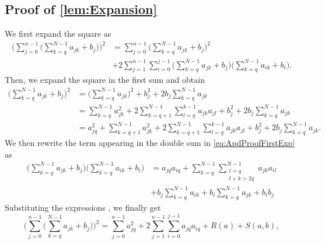 \documentclass[10pt]{article}
\begin{document}
\subsection*{Proof of \cref{lem:Expansion}} 
We first expand the square as
	\begin{equation}\label{eq:ApdProofFirstExp}
	\begin{aligned}
		\Big(\sum_{j=0}^{n-1} \Big(\sum_{k=q}^{N-1} a_{jk} + b_j\Big)\Big)^2 &= \sum_{j=0}^{n-1} \Big(\sum_{k=q}^{N-1} a_{jk} + b_j\Big)^2 \\
		&+ 2 \sum_{j=1}^{n-1} \sum_{i=0}^{j-1}\Big(\sum_{k=q}^{N-1} a_{jk} + b_j\Big)\Big(\sum_{k=q}^{N-1} a_{ik} + b_i\Big).
	\end{aligned}
	\end{equation}
	Then, we expand the square in the first sum and obtain
	\begin{equation}\label{eq:ApdProofSndExp}
	\begin{aligned}
		\Big(\sum_{k=q}^{N-1} a_{jk} + b_j\Big)^2 &= \Big(\sum_{k=q}^{N-1} a_{jk}\Big)^2 + b_j^2 + 2 b_j \sum_{k=q}^{N-1} a_{jk}\\
		&= \sum_{k=q}^{N-1} a_{jk}^2 + 2\sum_{k=q+1}^{N-1}\sum_{l=q}^{k-1} a_{jk} a_{jl} + b_j^2 + 2 b_j \sum_{k=q}^{N-1} a_{jk}\\
		&= a_{jq}^2 + \sum_{k=q+1}^{N-1} a_{jk}^2 + 2\sum_{k=q+1}^{N-1}\sum_{l=q}^{k-1} a_{jk} a_{jl} + b_j^2 + 2 b_j \sum_{k=q}^{N-1} a_{jk}.
	\end{aligned}
	\end{equation}	
	We then rewrite the term appearing in the double sum in \eqref{eq:ApdProofFirstExp} as
	\begin{equation}\label{eq:ApdProofThirdExp}
	\begin{aligned}
		\Big(\sum_{k=q}^{N-1} a_{jk} + b_j\Big)\Big(\sum_{k=q}^{N-1} a_{ik} + b_i\Big) &= a_{jq}a_{iq} + \sum_{k=q}^{N-1}\sum_{\substack{l=q \\ l+k > 2q}}^{N-1} a_{jk}a_{il} \\
		&+ b_j \sum_{k=q}^{N-1} a_{ik} + b_i \sum_{k=q}^{N-1} a_{jk} + b_i b_j 
	\end{aligned}
	\end{equation}
	Substituting the expressions , we finally get 
	\begin{equation}
		\Big(\sum_{j=0}^{n-1} \Big(\sum_{k=q}^{N-1} a_{jk} + b_j\Big)\Big)^2 = \sum_{j=0}^{n-1} a_{jq}^2 + 2 \sum_{j=1}^{n-1} \sum_{i=0}^{j-1} a_{jq}a_{iq} + R(a) + S(a, b),
	\end{equation}
\end{document}
